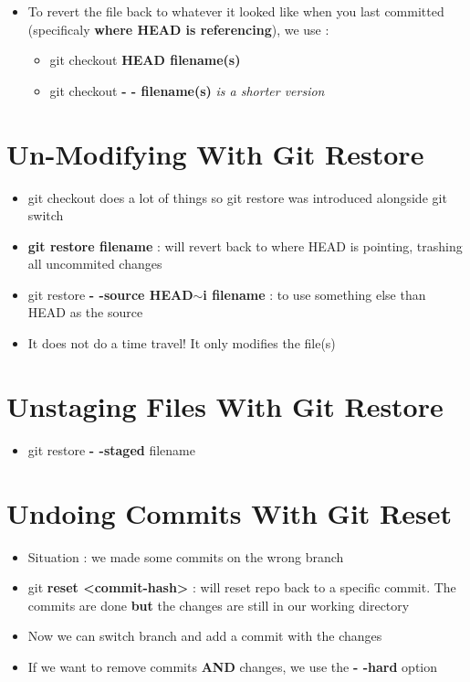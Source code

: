 \documentclass{report}
\newcommand{\warning}{
	{\fontencoding{U}\fontfamily{futs}\selectfont\char 66\relax}
}
\begin{document}
\begin{itemize}
	\item To revert the file back to whatever it looked like when you last committed (specificaly \textbf{where HEAD is referencing}), we use :
		\begin{itemize}
			\item git checkout \textbf{HEAD filename(s)} 
			\item git checkout \textbf{- - filename(s)} \textit{is a shorter version}
		\end{itemize}
\end{itemize}


\section{Un-Modifying With Git Restore}

\begin{itemize}
	\item git checkout does a lot of things so git restore was introduced alongside git switch 
	\item \textbf{git restore filename} : will revert back to where HEAD is pointing, trashing all uncommited changes 
	\item git restore \textbf{- -source HEAD$\sim$i filename} : to use something else than HEAD as the source 
	\item It does not do a time travel! It only modifies the file(s)
\end{itemize}


\section{Unstaging Files With Git Restore}

\begin{itemize}
	\item git restore \textbf{- -staged} filename 
\end{itemize}


\section{Undoing Commits With Git Reset}

\begin{itemize}
	\item Situation : we made some commits on the wrong branch 
	\item git \textbf{reset <commit-hash>} : will reset repo back to a specific commit. The commits are done \textbf{but} \warning the changes are still in our working directory 
	\item Now we can switch branch and add a commit with the changes 
	\item If we want to remove commits \textbf{AND} changes, we use the \textbf{- -hard} option
\end{itemize}
\end{document}
